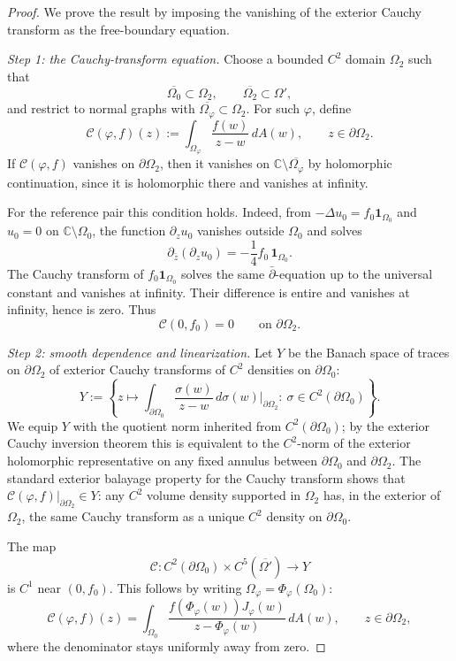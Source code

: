 \documentclass[a4paper,11pt,reqno]{amsart}
\numberwithin{equation}{section}
\theoremstyle{plain} %
\theoremstyle{definition} %
\theoremstyle{remark}
\newcommand{\C}{\mathbb{C}}
\begin{document}
\begin{proof}
We prove the result by imposing the vanishing of the exterior Cauchy transform
as the free-boundary equation.

\medskip
\noindent\emph{Step 1: the Cauchy-transform equation.}
Choose a bounded \(C^2\) domain \(\Omega_2\) such that
\[
\overline{\Omega_0}\subset\Omega_2,\qquad
\overline{\Omega_2}\subset\Omega',
\]
and restrict to normal graphs with \(\overline{\Omega_\varphi}\subset\Omega_2\).
For such \(\varphi\), define
\[
\mathcal C(\varphi,f)(z)
:=
\int_{\Omega_\varphi}\frac{f(w)}{z-w}\,dA(w),
\qquad z\in\partial\Omega_2 .
\]
If \(\mathcal C(\varphi,f)\) vanishes on \(\partial\Omega_2\), then it vanishes
on \(\C\setminus\overline{\Omega_\varphi}\) by holomorphic continuation, since
it is holomorphic there and vanishes at infinity.

For the reference pair this condition holds. Indeed, from
\(-\Delta u_0=f_0\mathbf 1_{\Omega_0}\) and \(u_0=0\) on
\(\C\setminus\Omega_0\), the function \(\partial_z u_0\) vanishes outside
\(\Omega_0\) and solves
\[
\partial_{\bar z}(\partial_z u_0)=-\frac14f_0\,\mathbf 1_{\Omega_0}.
\]
The Cauchy transform of \(f_0\mathbf 1_{\Omega_0}\) solves the same
\(\bar\partial\)-equation up to the universal constant and vanishes at
infinity. Their difference is entire and vanishes at infinity, hence is zero.
Thus
\[
\mathcal C(0,f_0)=0
\qquad\text{on }\partial\Omega_2 .
\]

\medskip
\noindent\emph{Step 2: smooth dependence and linearization.}
Let \(Y\) be the Banach space of traces on \(\partial\Omega_2\) of exterior
Cauchy transforms of \(C^2\) densities on \(\partial\Omega_0\):
\[
Y:=
\left\{
z\mapsto
\int_{\partial\Omega_0}\frac{\sigma(w)}{z-w}\,d\sigma(w)
\Big|_{\partial\Omega_2}
:\ \sigma\in C^2(\partial\Omega_0)
\right\}.
\]
We equip \(Y\) with the quotient norm inherited from \(C^2(\partial\Omega_0)\);
by the exterior Cauchy inversion theorem this is equivalent to the
\(C^2\)-norm of the exterior holomorphic representative on any fixed annulus
between \(\partial\Omega_0\) and \(\partial\Omega_2\). The standard exterior
balayage property for the Cauchy transform shows that
\(\mathcal C(\varphi,f)|_{\partial\Omega_2}\in Y\): any \(C^2\) volume density
supported in \(\Omega_2\) has, in the exterior of \(\Omega_2\), the same Cauchy
transform as a unique \(C^2\) density on \(\partial\Omega_0\).

The map
\[
\mathcal C:
C^2(\partial\Omega_0)\times C^5(\overline{\Omega'})
\to Y
\]
is \(C^1\) near \((0,f_0)\). This follows by writing
\(\Omega_\varphi=\Phi_\varphi(\Omega_0)\):
\[
\mathcal C(\varphi,f)(z)
=
\int_{\Omega_0}
\frac{f(\Phi_\varphi(w))J_\varphi(w)}{z-\Phi_\varphi(w)}\,dA(w),
\qquad z\in\partial\Omega_2,
\]
where the denominator stays uniformly away from zero.


\end{proof}
\end{document}
